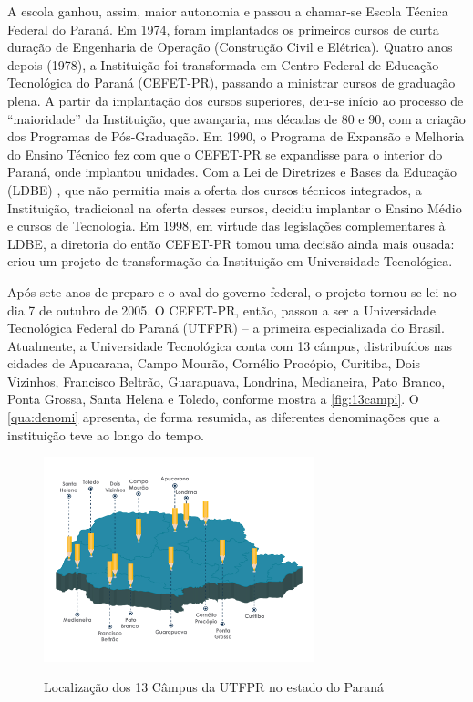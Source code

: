 A escola ganhou, assim, maior autonomia e passou a chamar-se Escola Técnica Federal do Paraná. Em 1974, foram implantados os primeiros cursos de curta duração de Engenharia de Operação (Construção Civil e Elétrica). Quatro anos depois (1978), a Instituição foi transformada em Centro Federal de Educação Tecnológica do Paraná (CEFET-PR), passando a ministrar cursos de graduação plena. A partir da implantação dos cursos superiores, deu-se início ao processo de “maioridade” da Instituição, que avançaria, nas décadas de 80 e 90, com a criação dos Programas de Pós-Graduação. Em 1990, o Programa de Expansão e Melhoria do Ensino Técnico fez com que o CEFET-PR se expandisse para o interior do Paraná, onde implantou unidades. Com a Lei de Diretrizes e Bases da Educação (LDBE) \cite{Lei:9394:1996}, que não permitia mais a oferta dos cursos técnicos integrados, a Instituição, tradicional na oferta desses cursos, decidiu implantar o Ensino Médio e cursos de Tecnologia. Em 1998, em virtude das legislações complementares à LDBE, a diretoria do então CEFET-PR tomou uma decisão ainda mais ousada: criou um projeto de transformação da Instituição em Universidade Tecnológica.


Após sete anos de preparo e o aval do governo federal, o projeto tornou-se lei no dia 7 de outubro de 2005. O CEFET-PR, então, passou a ser a Universidade Tecnológica Federal do Paraná (UTFPR) \cite{Lei:11.184:2005} – a primeira especializada do Brasil. Atualmente, a Universidade Tecnológica conta com 13 câmpus, distribuídos nas cidades de Apucarana, Campo Mourão, Cornélio Procópio, Curitiba, Dois Vizinhos, Francisco Beltrão, Guarapuava, Londrina,  Medianeira, Pato Branco, Ponta Grossa, Santa Helena e Toledo, conforme mostra a \autoref{fig:13campi}. O \autoref{qua:denomi} apresenta, de forma resumida, as diferentes denominações que a instituição teve ao longo do tempo.


    \begin{figure}[!htb]
        \centering
        \caption[Localização dos 13 Câmpus da UTFPR]{Localização dos 13 Câmpus da UTFPR no estado do Paraná}
        \includegraphics[width=0.7\textwidth]{Caps/Figs/campus_utfpr.png}
        \fonte{\utf}
        \label{fig:13campi}
    \end{figure}
    
